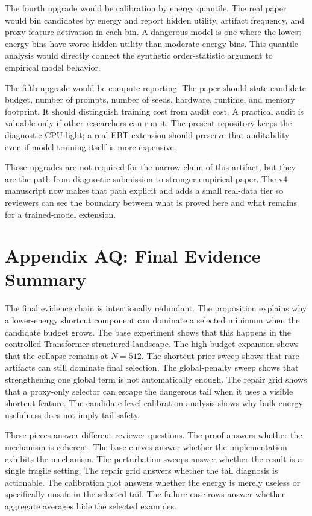 \documentclass{article}
\begin{document}
The fourth upgrade would be calibration by energy quantile. The real paper
would bin candidates by energy and report hidden utility, artifact frequency,
and proxy-feature activation in each bin. A dangerous model is one where the
lowest-energy bins have worse hidden utility than moderate-energy bins. This
quantile analysis would directly connect the synthetic order-statistic
argument to empirical model behavior.

The fifth upgrade would be compute reporting. The paper should state candidate
budget, number of prompts, number of seeds, hardware, runtime, and memory
footprint. It should distinguish training cost from audit cost. A practical
audit is valuable only if other researchers can run it. The present repository
keeps the diagnostic CPU-light; a real-EBT extension should preserve that
auditability even if model training itself is more expensive.

Those upgrades are not required for the narrow claim of this artifact, but
they are the path from diagnostic submission to stronger empirical paper. The
v4 manuscript now makes that path explicit and adds a small real-data tier so
reviewers can see the boundary between what is proved here and what remains
for a trained-model extension.

\section*{Appendix AQ: Final Evidence Summary}

The final evidence chain is intentionally redundant. The proposition explains
why a lower-energy shortcut component can dominate a selected minimum when the
candidate budget grows. The base experiment shows that this happens in the
controlled Transformer-structured landscape. The high-budget expansion shows
that the collapse remains at $N=512$. The shortcut-prior sweep shows that rare
artifacts can still dominate final selection. The global-penalty sweep shows
that strengthening one global term is not automatically enough. The repair
grid shows that a proxy-only selector can escape the dangerous tail when it
uses a visible shortcut feature. The candidate-level calibration analysis
shows why bulk energy usefulness does not imply tail safety.

These pieces answer different reviewer questions. The proof answers whether
the mechanism is coherent. The base curves answer whether the implementation
exhibits the mechanism. The perturbation sweeps answer whether the result is a
single fragile setting. The repair grid answers whether the tail diagnosis is
actionable. The calibration plot answers whether the energy is merely useless
or specifically unsafe in the selected tail. The failure-case rows answer
whether aggregate averages hide the selected examples.
\end{document}
